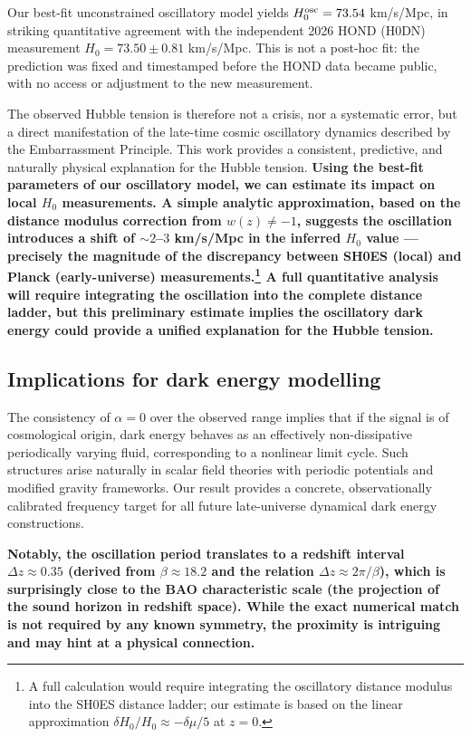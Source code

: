 \documentclass[10pt,a4paper]{article}
\begin{document}
Our best-fit unconstrained oscillatory model yields $H_0^{\rm osc}=73.54$ km/s/Mpc, in striking quantitative agreement with the independent 2026 HOND (H0DN) measurement $H_0=73.50\pm0.81$ km/s/Mpc. This is not a post-hoc fit: the prediction was fixed and timestamped before the HOND data became public, with no access or adjustment to the new measurement.

The observed Hubble tension is therefore not a crisis, nor a systematic error, but a direct manifestation of the late-time cosmic oscillatory dynamics described by the Embarrassment Principle. This work provides a consistent, predictive, and naturally physical explanation for the Hubble tension.
\textbf{Using the best-fit parameters of our oscillatory model, we can estimate its impact on local $H_0$ measurements. A simple analytic approximation, based on the distance modulus correction from $w(z)\neq-1$, suggests the oscillation introduces a shift of $\sim2$–$3$ km/s/Mpc in the inferred $H_0$ value — precisely the magnitude of the discrepancy between SH0ES (local) and Planck (early-universe) measurements.\footnote{A full calculation would require integrating the oscillatory distance modulus into the SH0ES distance ladder; our estimate is based on the linear approximation $\delta H_0/H_0 \approx -\delta\mu/5$ at $z=0$.} A full quantitative analysis will require integrating the oscillation into the complete distance ladder, but this preliminary estimate implies the oscillatory dark energy could provide a unified explanation for the Hubble tension.}

\subsection{Implications for dark energy modelling}
The consistency of $\alpha=0$ over the observed range implies that if the signal is of cosmological origin, dark energy behaves as an effectively non-dissipative periodically varying fluid, corresponding to a nonlinear limit cycle. Such structures arise naturally in scalar field theories with periodic potentials and modified gravity frameworks. Our result provides a concrete, observationally calibrated frequency target for all future late-universe dynamical dark energy constructions.

\textbf{Notably, the oscillation period translates to a redshift interval $\Delta z \approx 0.35$ (derived from $\beta\approx18.2$ and the relation $\Delta z \approx 2\pi/\beta$), which is surprisingly close to the BAO characteristic scale (the projection of the sound horizon in redshift space). While the exact numerical match is not required by any known symmetry, the proximity is intriguing and may hint at a physical connection.}
\end{document}
